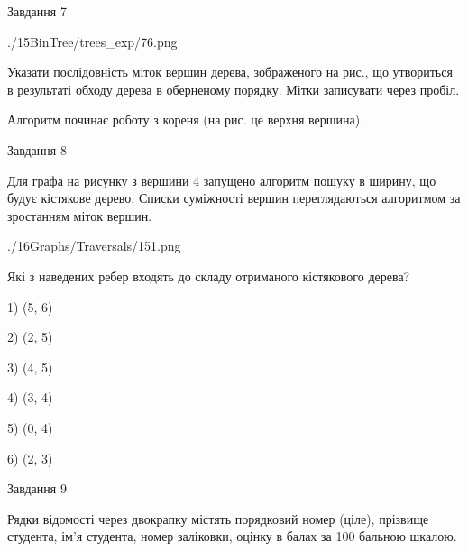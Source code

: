 \documentclass[12pt, ukrainian]{article}
\begin{document}
{\vspace{10mm}\par

\newpage
\begin{minipage}[t]{9.7cm}
               
{\begin{center}Завдання {7}\end{center}}
\vspace{-6mm}

\begin{center}
	{./15BinTree/trees_exp/76.png}
\end{center}
Указати послідовність міток вершин дерева, зображеного на рис., що утвориться в результаті обходу дерева в оберненому порядку. Мітки записувати через пробіл.\par Алгоритм починає роботу з кореня (на рис. це верхня вершина).\par

\end{minipage}
\vline \hspace{8mm}
\begin{minipage}[t]{8.0cm}
               
{\begin{center}Завдання {8}\end{center}}
\vspace{-6mm}
Для графа на рисунку з вершини 4 запущено алгоритм пошуку в ширину, що будує кістякове дерево. Списки суміжності вершин переглядаються алгоритмом за зростанням міток вершин.\par
\begin{center}
	{./16Graphs/Traversals/151.png}
\end{center}
\par Які з наведених ребер входять до складу отриманого кістякового дерева?\par
1) (5, 6)\par
2) (2, 5)\par
3) (4, 5)\par
4) (3, 4)\par
5) (0, 4)\par
6) (2, 3)\par
{\vskip 15pt} \par

\end{minipage}

               
{\begin{center}Завдання {9}\end{center}}
\vspace{-6mm}
Рядки відомості через двокрапку містять порядковий номер (ціле), пріз\-ви\-ще студен\-та, ім'я студента, номер заліковки, оцінку в балах за 100 бальною шкалою.

}
\end{document}
